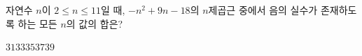 자연수 $n$이 $2\le n\le 11$일 때, $-n^{2}+9n-18$의 $n$제곱근 중에서 음의 실수가 존재하도록 하는 모든 $n$의 값의 합은?
\begin{choices32}{$31$}{$33$}{$35$}{$37$}{$39$}\end{choices32}
